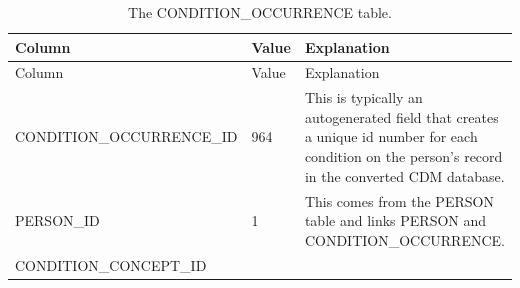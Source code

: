 \documentclass[11pt]{book}
\begin{document}
\begin{longtable}[]{@{}lll@{}}
\caption{\label{tab:conditionOccurrence} The CONDITION\_OCCURRENCE
table.}\tabularnewline
\toprule
\begin{minipage}[b]{0.31\columnwidth}\raggedright\strut
Column\strut
\end{minipage} & \begin{minipage}[b]{0.12\columnwidth}\raggedright\strut
Value\strut
\end{minipage} & \begin{minipage}[b]{0.48\columnwidth}\raggedright\strut
Explanation\strut
\end{minipage}\tabularnewline
\midrule
\endfirsthead
\toprule
\begin{minipage}[b]{0.31\columnwidth}\raggedright\strut
Column\strut
\end{minipage} & \begin{minipage}[b]{0.12\columnwidth}\raggedright\strut
Value\strut
\end{minipage} & \begin{minipage}[b]{0.48\columnwidth}\raggedright\strut
Explanation\strut
\end{minipage}\tabularnewline
\midrule
\endhead
\begin{minipage}[t]{0.31\columnwidth}\raggedright\strut
CONDITION\_OCCURRENCE\_ID\strut
\end{minipage} & \begin{minipage}[t]{0.12\columnwidth}\raggedright\strut
964\strut
\end{minipage} & \begin{minipage}[t]{0.48\columnwidth}\raggedright\strut
This is typically an autogenerated field that creates a unique id number
for each condition on the person's record in the converted CDM
database.\strut
\end{minipage}\tabularnewline
\begin{minipage}[t]{0.31\columnwidth}\raggedright\strut
PERSON\_ID\strut
\end{minipage} & \begin{minipage}[t]{0.12\columnwidth}\raggedright\strut
1\strut
\end{minipage} & \begin{minipage}[t]{0.48\columnwidth}\raggedright\strut
This comes from the PERSON table and links PERSON and
CONDITION\_OCCURRENCE.\strut
\end{minipage}\tabularnewline
\begin{minipage}[t]{0.31\columnwidth}\raggedright\strut
CONDITION\_CONCEPT\_ID\strut

\end{minipage}
\end{longtable}
\end{document}
